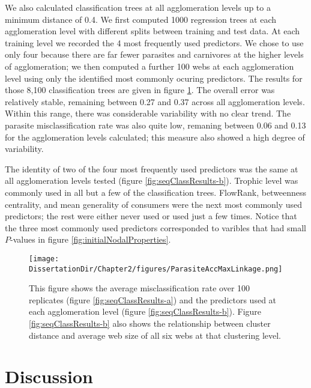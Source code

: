 \documentclass[../dissertation.tex]{subfiles}
\begin{document}
We also calculated classification trees at all agglomeration levels up to a
minimum distance of 0.4. We first computed 1000 regression trees at each
agglomeration level with different splits between training and test data. At
each training level we recorded the 4 most frequently used predictors. We chose
to use only four because there are far fewer parasites and carnivores at the
higher levels of agglomeration; we then computed a further 100 webs at each
agglomeration level using only the identified most commonly ocuring predictors.
The results for those 8,100 classification trees are given in figure
\ref{fig:seqClassResults}. The overall error was relatively stable, remaining
between 0.27 and 0.37 across all agglomeration levels. Within this range, there
was considerable variability with no clear trend. The parasite
misclassification rate was also quite low, remaning between 0.06 and 0.13 for
the agglomeration levels calculated; this measure also showed a high degree of
variability.

The identity of two of the four most frequently used predictors was the same at
all agglomeration levels tested (figure \ref{fig:seqClassResults-b}). Trophic
level was commonly used in all but a few of the classification trees. FlowRank,
betweenness centrality, and mean generality of consumers were the next most
commonly used predictors; the rest were either never used or used just a few
times. Notice that the three most commonly used predictors corresponded to
varibles that had small $P$-values in figure \ref{fig:initialNodalProperties}.

\begin{figure}
    \centering
    {%
    }%

        \texttt{[image: \\DissertationDir/Chapter2/figures/ParasiteAccMaxLinkage.png]}
        \caption{This figure shows the average misclassification rate over 100
            replicates (figure \ref{fig:seqClassResults-a}) and the predictors
            used at each agglomeration level (figure
            \ref{fig:seqClassResults-b}). Figure \ref{fig:seqClassResults-b}
            also shows the relationship between cluster distance and average
            web size of all six webs at that clustering level.  
        \label{fig:seqClassResults}} 
\end{figure}

\section{Discussion} 
\end{document}
